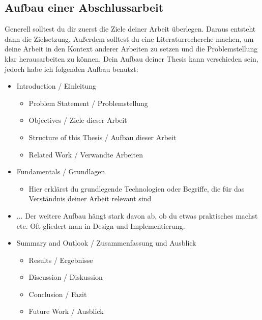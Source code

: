 \subsection{Aufbau einer Abschlussarbeit}
Generell solltest du dir zuerst die Ziele deiner Arbeit überlegen. Daraus entsteht dann die Zielsetzung.
Außerdem solltest du eine Literaturrecherche machen, um deine Arbeit in den Kontext anderer Arbeiten zu setzen und die Problemstellung klar herausarbeiten zu können. Dein Aufbau deiner Thesis kann verschieden sein, jedoch habe ich folgenden Aufbau benutzt:
\begin{itemize}
    \item Introduction / Einleitung
          \begin{itemize}
              \item Problem Statement / Problemstellung
              \item Objectives / Ziele dieser Arbeit
              \item Structure of this Thesis / Aufbau dieser Arbeit
              \item Related Work / Verwandte Arbeiten
          \end{itemize}
    \item Fundamentals / Grundlagen
          \begin{itemize}
              \item Hier erklärst du grundlegende Technologien oder Begriffe, die für das Verständnis deiner Arbeit relevant sind
          \end{itemize}
    \item ... Der weitere Aufbau hängt stark davon ab, ob du etwas praktisches machst etc. Oft gliedert man in Design und Implementierung.
    \item Summary and Outlook / Zusammenfassung und Ausblick
          \begin{itemize}
              \item Results / Ergebnisse
              \item Discussion / Diskussion
              \item Conclusion / Fazit
              \item Future Work / Ausblick
          \end{itemize}
\end{itemize}